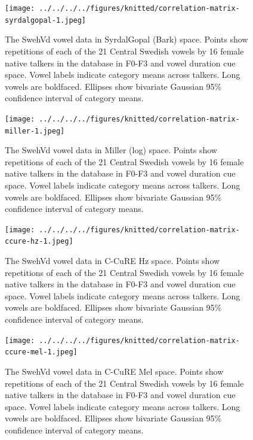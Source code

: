 \documentclass[utf8]{frontiers_suppmat} %
\begin{document}
\begin{figure}[H]
\texttt{[image: ../../../../figures/knitted/correlation-matrix-syrdalgopal-1.jpeg]} \caption{The SwehVd vowel data in SyrdalGopal (Bark) space. Points show repetitions of each of the 21 Central Swedish vowels by 16 female native talkers in the database in F0-F3 and vowel duration cue space. Vowel labels indicate category means across talkers. Long vowels are boldfaced. Ellipses show bivariate Gaussian 95\% confidence interval of category means.}\label{fig:correlation-matrix-syrdalgopal}
\end{figure}



\begin{figure}[H]
\texttt{[image: ../../../../figures/knitted/correlation-matrix-miller-1.jpeg]} \caption{The SwehVd vowel data in Miller (log) space. Points show repetitions of each of the 21 Central Swedish vowels by 16 female native talkers in the database in F0-F3 and vowel duration cue space. Vowel labels indicate category means across talkers. Long vowels are boldfaced. Ellipses show bivariate Gaussian 95\% confidence interval of category means.}\label{fig:correlation-matrix-miller}
\end{figure}



\begin{figure}[H]
\texttt{[image: ../../../../figures/knitted/correlation-matrix-ccure-hz-1.jpeg]} \caption{The SwehVd vowel data in C-CuRE Hz space. Points show repetitions of each of the 21 Central Swedish vowels by 16 female native talkers in the database in F0-F3 and vowel duration cue space. Vowel labels indicate category means across talkers. Long vowels are boldfaced. Ellipses show bivariate Gaussian 95\% confidence interval of category means.}\label{fig:correlation-matrix-ccure-hz}
\end{figure}



\begin{figure}[H]
\texttt{[image: ../../../../figures/knitted/correlation-matrix-ccure-mel-1.jpeg]} \caption{The SwehVd vowel data in C-CuRE Mel space. Points show repetitions of each of the 21 Central Swedish vowels by 16 female native talkers in the database in F0-F3 and vowel duration cue space. Vowel labels indicate category means across talkers. Long vowels are boldfaced. Ellipses show bivariate Gaussian 95\% confidence interval of category means.}\label{fig:correlation-matrix-ccure-mel}
\end{figure}
\end{document}

